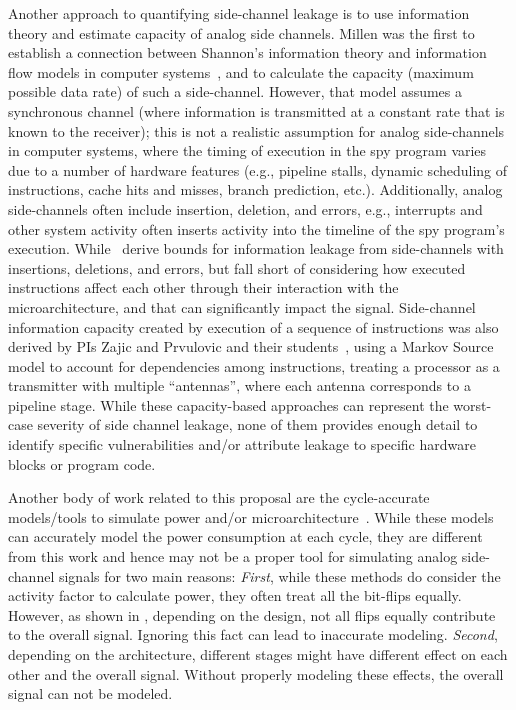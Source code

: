 \documentclass[11 pt]{article}
\begin{document}
Another approach to quantifying side-channel leakage is to use information theory and estimate capacity of analog side channels. Millen was the first to establish a connection between Shannon's information theory and information flow models in computer systems~\cite{Millen87}, and to calculate the capacity (maximum possible data rate) of such a side-channel.
However, that model assumes a synchronous channel (where information is transmitted at a constant rate that is known to the receiver); this is not a realistic assumption for analog side-channels in computer systems, where the timing of execution in the spy program varies
due to a number of hardware features (e.g., pipeline stalls, dynamic scheduling of instructions, cache hits and misses, branch prediction, etc.).
Additionally, analog side-channels often include insertion, deletion, and errors, e.g., interrupts and other system activity often inserts activity into the timeline of the spy program's execution.
While~\cite{baki18icassp,baki18milcom,baki17} derive bounds for information leakage from side-channels with insertions, deletions, and errors, but fall short of considering how executed instructions affect each other through their interaction with the microarchitecture,
and that can significantly impact the signal. Side-channel information capacity created by execution of a sequence of instructions was also derived by PIs Zajic and Prvulovic and their students~\cite{Baki_2020a}, using a Markov Source model to account for dependencies among instructions, treating a processor as a transmitter with multiple ``antennas'', where each antenna corresponds to a pipeline stage. While these capacity-based approaches can
represent the worst-case severity of side channel leakage, none of them provides enough detail to identify specific vulnerabilities and/or attribute leakage to specific hardware blocks or program code.

Another body of work related to this proposal are the cycle-accurate models/tools to simulate power and/or microarchitecture~\cite{Li:2009:MIP:1669112.1669172,Li:2011:CAM:2132325.2132479,509850,Ardestani:2013:EFM:2495252.2495480,Binkert:2011:GS:2024716.2024718,sesc,5982026,carlson2014aeohmcm}. While these models can accurately model the power consumption at each cycle, they are different from this work and hence may not be a proper tool for simulating analog side-channel signals for two main reasons: \textit{First}, while these methods do consider the activity factor to calculate power, they often treat all the bit-flips equally. However, as shown in \cite{Nader2020}, depending on the design, not all flips equally contribute to the overall signal. Ignoring this fact can lead to inaccurate modeling. \textit{Second}, depending on the architecture, different stages might have different effect on each other and the overall signal. Without properly modeling these effects, the overall signal can not be modeled.
\end{document}
